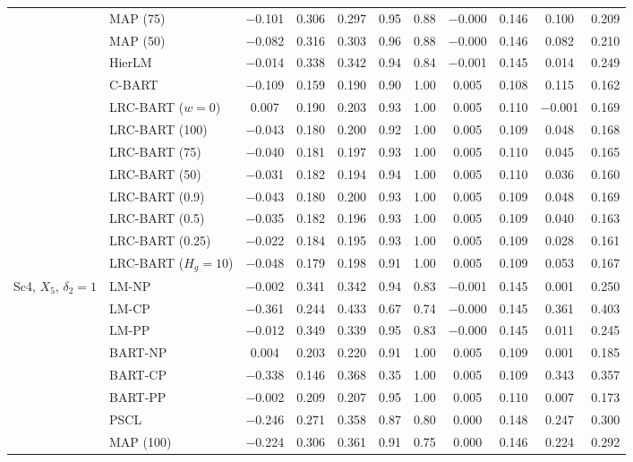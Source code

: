 \begin{center}
\begin{longtable}{llccccccccc}
& MAP (75) & $-$0.101 & 0.306 & 0.297 & 0.95 & 0.88 & $-$0.000 & 0.146 & 0.100 & 0.209 \\
& MAP (50) & $-$0.082 & 0.316 & 0.303 & 0.96 & 0.88 & $-$0.000 & 0.146 & 0.082 & 0.210 \\
& HierLM & $-$0.014 & 0.338 & 0.342 & 0.94 & 0.84 & $-$0.001 & 0.145 & 0.014 & 0.249 \\
& C-BART & $-$0.109 & 0.159 & 0.190 & 0.90 & 1.00 & 0.005 & 0.108 & 0.115 & 0.162 \\
& LRC-BART ($w=0$) & 0.007 & 0.190 & 0.203 & 0.93 & 1.00 & 0.005 & 0.110 & $-$0.001 & 0.169 \\
& LRC-BART (100) & $-$0.043 & 0.180 & 0.200 & 0.92 & 1.00 & 0.005 & 0.109 & 0.048 & 0.168 \\
& LRC-BART (75) & $-$0.040 & 0.181 & 0.197 & 0.93 & 1.00 & 0.005 & 0.110 & 0.045 & 0.165 \\
& LRC-BART (50) & $-$0.031 & 0.182 & 0.194 & 0.94 & 1.00 & 0.005 & 0.110 & 0.036 & 0.160 \\
& LRC-BART (0.9) & $-$0.043 & 0.180 & 0.200 & 0.93 & 1.00 & 0.005 & 0.109 & 0.048 & 0.169 \\
& LRC-BART (0.5) & $-$0.035 & 0.182 & 0.196 & 0.93 & 1.00 & 0.005 & 0.109 & 0.040 & 0.163 \\
& LRC-BART (0.25) & $-$0.022 & 0.184 & 0.195 & 0.93 & 1.00 & 0.005 & 0.109 & 0.028 & 0.161 \\
& LRC-BART ($H_g=10$) & $-$0.048 & 0.179 & 0.198 & 0.91 & 1.00 & 0.005 & 0.109 & 0.053 & 0.167 \\
\midrule
\multirow{20}{*}{Sc4, $X_5$, $\delta_2=1$} & LM-NP & $-$0.002 & 0.341 & 0.342 & 0.94 & 0.83 & $-$0.001 & 0.145 & 0.001 & 0.250 \\
& LM-CP & $-$0.361 & 0.244 & 0.433 & 0.67 & 0.74 & $-$0.000 & 0.145 & 0.361 & 0.403 \\
& LM-PP & $-$0.012 & 0.349 & 0.339 & 0.95 & 0.83 & $-$0.000 & 0.145 & 0.011 & 0.245 \\
& BART-NP & 0.004 & 0.203 & 0.220 & 0.91 & 1.00 & 0.005 & 0.109 & 0.001 & 0.185 \\
& BART-CP & $-$0.338 & 0.146 & 0.368 & 0.35 & 1.00 & 0.005 & 0.109 & 0.343 & 0.357 \\
& BART-PP & $-$0.002 & 0.209 & 0.207 & 0.95 & 1.00 & 0.005 & 0.110 & 0.007 & 0.173 \\
& PSCL & $-$0.246 & 0.271 & 0.358 & 0.87 & 0.80 & 0.000 & 0.148 & 0.247 & 0.300 \\
& MAP (100) & $-$0.224 & 0.306 & 0.361 & 0.91 & 0.75 & 0.000 & 0.146 & 0.224 & 0.292 \\

\end{longtable}
\end{center}
